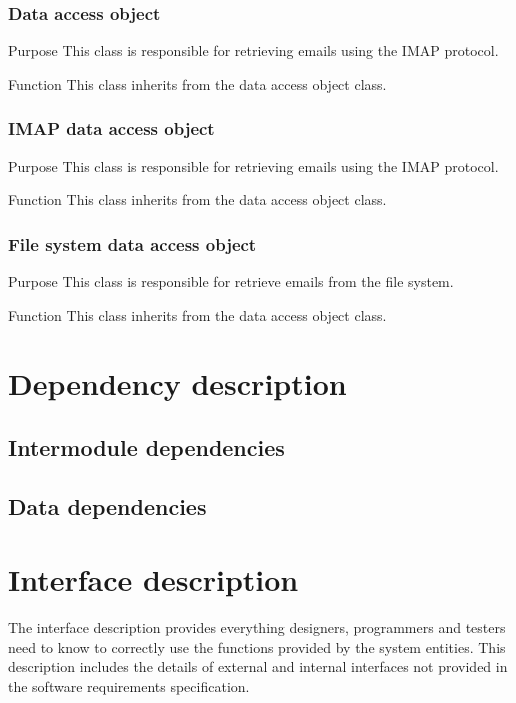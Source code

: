 \documentclass[12pt]{article}
\newenvironment{my_desc}
{\begin{description}
  \setlength{\itemsep}{0cm}
  \setlength{\parskip}{0cm}}
{\end{description}}
\begin{document}
\subsubsection{Data access object}
  \begin{my_desc}
   \item[Purpose] This class is responsible for retrieving emails using the IMAP protocol.
   \item[Function] This class inherits from the data access object class.
  \end{my_desc}

\subsubsection{IMAP data access object}
  \begin{my_desc}
   \item[Purpose] This class is responsible for retrieving emails using the IMAP protocol.
   \item[Function] This class inherits from the data access object class.
  \end{my_desc}


\subsubsection{File system data access object}
  \begin{my_desc}
   \item[Purpose] This class is responsible for retrieve emails from the file system.
   \item[Function] This class inherits from the data access object class.
  \end{my_desc}

\section{Dependency description}
\subsection{Intermodule dependencies}
\subsection{Data dependencies}

\section{Interface description}
The interface description provides everything designers, programmers and testers need to know to correctly use the functions provided by the system entities. This description includes the details of external and internal interfaces not provided in the software requirements speciﬁcation.
\end{document}
